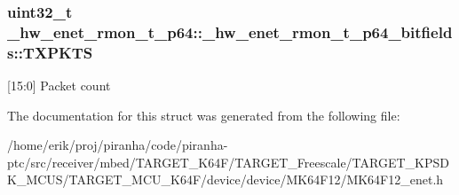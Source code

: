 \subsubsection[{\texorpdfstring{T\+X\+P\+K\+TS}{TXPKTS}}]{\setlength{\rightskip}{0pt plus 5cm}uint32\+\_\+t \+\_\+hw\+\_\+enet\+\_\+rmon\+\_\+t\+\_\+p64\+::\+\_\+hw\+\_\+enet\+\_\+rmon\+\_\+t\+\_\+p64\+\_\+bitfields\+::\+T\+X\+P\+K\+TS}\hypertarget{struct__hw__enet__rmon__t__p64_1_1__hw__enet__rmon__t__p64__bitfields_a1dc4e6c3f8733e41212be2d5a7313ef9}{}\label{struct__hw__enet__rmon__t__p64_1_1__hw__enet__rmon__t__p64__bitfields_a1dc4e6c3f8733e41212be2d5a7313ef9}
\mbox{[}15\+:0\mbox{]} Packet count 

The documentation for this struct was generated from the following file\+:\begin{DoxyCompactItemize}
\item 
/home/erik/proj/piranha/code/piranha-\/ptc/src/receiver/mbed/\+T\+A\+R\+G\+E\+T\+\_\+\+K64\+F/\+T\+A\+R\+G\+E\+T\+\_\+\+Freescale/\+T\+A\+R\+G\+E\+T\+\_\+\+K\+P\+S\+D\+K\+\_\+\+M\+C\+U\+S/\+T\+A\+R\+G\+E\+T\+\_\+\+M\+C\+U\+\_\+\+K64\+F/device/device/\+M\+K64\+F12/M\+K64\+F12\+\_\+enet.\+h\end{DoxyCompactItemize}
